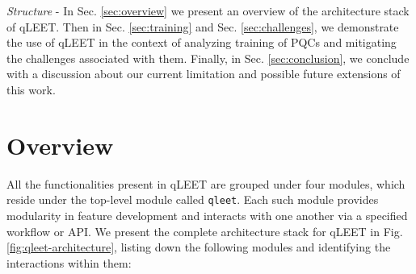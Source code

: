 \documentclass[%
 reprint,
 amsmath,
 amssymb,
 showkeys,
 pra,
 floatfix,
]{revtex4-2}
\begin{document}
\textit{Structure} - In Sec. \ref{sec:overview} we present an overview of the architecture stack of qLEET. Then in Sec. \ref{sec:training} and Sec. \ref{sec:challenges}, we demonstrate the use of qLEET in the context of analyzing training of PQCs and mitigating the challenges associated with them. Finally, in Sec. \ref{sec:conclusion}, we conclude with a discussion about our current limitation and possible future extensions of this work.

\section{\label{sec:overview}Overview}

All the functionalities present in qLEET are grouped under four modules, which reside under the top-level module called \texttt{qleet}. Each such module provides modularity in feature development and interacts with one another via a specified workflow or API. We present the complete architecture stack for qLEET in Fig. \ref{fig:qleet-architecture}, listing down the following modules and identifying the interactions within them:
\end{document}
